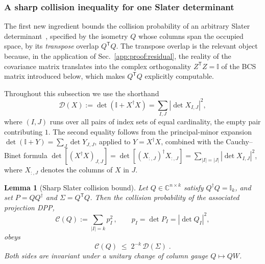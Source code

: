 \documentclass[prx,twocolumn,superscriptaddress,aps,10pt, frontmatterverbose, reprint,footinbib,longbibliography=true]{revtex4-2}
\newtheorem{lemma}{Lemma}
\newcommand{\trans}{\mathsf{T}}
\begin{document}
\subsubsection{A sharp collision inequality for one Slater determinant}
\label{app:proof:slater}

The first new ingredient bounds the collision probability of an arbitrary Slater determinant~\cite{Mbeng2024,surace}, specified by the isometry $Q$ whose columns span the occupied space, by its \emph{transpose} overlap $Q^{\trans}Q$. The transpose overlap is the relevant object because, in the application of Sec.~\ref{app:proof:residual}, the reality of the covariance matrix translates into the complex orthogonality $Z^{\trans}Z=\mathbb{I}$ of the BCS matrix introduced below, which makes $Q^{\trans}Q$ explicitly computable.

Throughout this subsection we use the shorthand
\begin{equation}
    \mathcal{D}(X):=\det\!\left(\mathbb{I}+X^\dagger X\right)
    =\sum_{I,J}\left|\det X_{I,J}\right|^2 ,
    \label{eq:Dfunctional}
\end{equation}
where $(I,J)$ runs over all pairs of index sets of equal cardinality, the empty pair contributing $1$. The second equality follows from the principal-minor expansion $\det(\mathbb{I}+Y)=\sum_J\det Y_{J,J}$, applied to $Y=X^\dagger X$, combined with the Cauchy--Binet formula $\det[(X^\dagger X)_{J,J}]=\det[(X_{:,J})^\dagger X_{:,J}]=\sum_{|I|=|J|}|\det X_{I,J}|^2$, where $X_{:,J}$ denotes the columns of $X$ in $J$.

\begin{lemma}[Sharp Slater collision bound]
\label{lem:Slater-bound}
Let $Q\in\mathbb{C}^{n\times k}$ satisfy $Q^\dagger Q=\mathbb{I}_k$, and set $P=QQ^\dagger$ and $\Sigma=Q^{\trans}Q$. Then the collision probability of the associated projection DPP,
\begin{equation}
    \mathcal{C}(Q):=\sum_{|I|=k}p_I^2\,,
    \qquad p_I=\det P_I=\left|\det Q_I\right|^2 ,
\end{equation}
obeys
\begin{equation}
    \mathcal{C}(Q)\;\le\;2^{-k}\,\mathcal{D}(\Sigma)\;.
    \label{eq:Slater-bound}
\end{equation}
Both sides are invariant under a unitary change of column gauge $Q\mapsto QW$.
\end{lemma}
\end{document}
